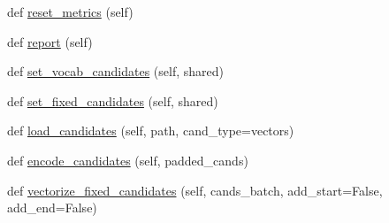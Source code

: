 \begin{DoxyCompactItemize}
def \hyperlink{classparlai_1_1core_1_1torch__ranker__agent_1_1TorchRankerAgent_ab526b2171567fd980451a795bb639cda}{reset\+\_\+metrics} (self)
\item 
def \hyperlink{classparlai_1_1core_1_1torch__ranker__agent_1_1TorchRankerAgent_a6314748dfa9aaf6e26145af686d5787d}{report} (self)
\item 
def \hyperlink{classparlai_1_1core_1_1torch__ranker__agent_1_1TorchRankerAgent_a41c604613a97e566bfcc31667d0dfc6a}{set\+\_\+vocab\+\_\+candidates} (self, shared)
\item 
def \hyperlink{classparlai_1_1core_1_1torch__ranker__agent_1_1TorchRankerAgent_a9039757596f98b45b6676b16589883a3}{set\+\_\+fixed\+\_\+candidates} (self, shared)
\item 
def \hyperlink{classparlai_1_1core_1_1torch__ranker__agent_1_1TorchRankerAgent_a353991d201d8889c453bf72c15ec78a9}{load\+\_\+candidates} (self, path, cand\+\_\+type=\textquotesingle{}vectors\textquotesingle{})
\item 
def \hyperlink{classparlai_1_1core_1_1torch__ranker__agent_1_1TorchRankerAgent_a1c8e4925f558783a51a28ccb577c42c7}{encode\+\_\+candidates} (self, padded\+\_\+cands)
\item 
def \hyperlink{classparlai_1_1core_1_1torch__ranker__agent_1_1TorchRankerAgent_af2e2d618f056bb68089c7252fa07d07b}{vectorize\+\_\+fixed\+\_\+candidates} (self, cands\+\_\+batch, add\+\_\+start=False, add\+\_\+end=False)
\end{DoxyCompactItemize}
